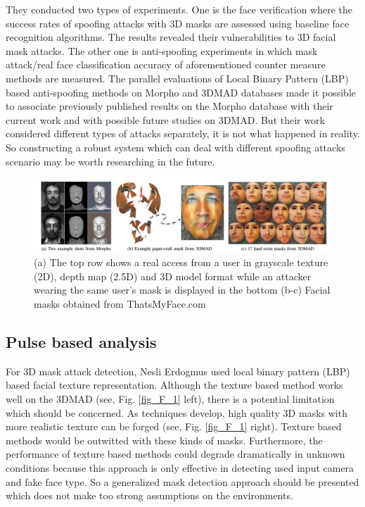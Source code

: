 \documentclass[journal]{IEEEtran}
\begin{document}
They conducted two types of experiments. One is the face verification where the success rates of spoofing attacks with 3D masks are assessed using baseline face recognition algorithms. The results revealed their vulnerabilities to 3D facial mask attacks. The other one is anti-spoofing experiments in which mask attack/real face classification accuracy of aforementioned counter measure methods are measured. The parallel evaluations of Local Binary Pattern (LBP) \cite{kose2013countermeasure} based anti-spoofing methods on Morpho and 3DMAD databases made it possible to associate previously published results on the Morpho database with their current work and with possible future studies on 3DMAD. But their work considered different types of attacks separately, it is not what happened in reality. So constructing a robust system which can deal with different spoofing attacks scenario may be worth researching in the future.


\begin{figure}[!t]
\centering
\includegraphics[width=1\linewidth]{img/3D_1}
\caption{(a) The top row shows a real access from a user in grayscale texture (2D), depth map (2.5D) and 3D model format while an attacker wearing the same user's mask is displayed in the bottom (b-c) Facial masks obtained from ThatsMyFace.com}
\label{fig_3D_1}
\end{figure}

\subsection{Pulse based analysis}

For 3D mask attack detection,  Nesli Erdogmus used local binary pattern (LBP) \cite{erdogmus2014spoofing} based facial texture representation. Although the texture based method works well on the 3DMAD (see, Fig. \ref{fig_F_1} left), there is a potential limitation which should be concerned. As techniques develop, high quality 3D masks with more realistic texture can be forged  (see, Fig. \ref{fig_F_1} right). Texture based methods would be  outwitted with these kinds of masks. Furthermore, the performance of texture based methods could degrade dramatically in unknown conditions because this approach is only effective in detecting used input camera and fake face type.  So a generalized mask detection approach should be presented which does not make too strong assumptions on the environments.
\end{document}
